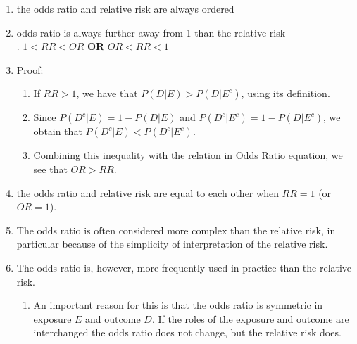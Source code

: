 \begin{enumerate}
    \item the odds ratio and relative risk are always ordered
    \hfill \cite{statistics/book/Statistics-for-Data-Scientists/Maurits-Kaptein}

    \item odds ratio is always further away from 1 than the relative risk
    \hfill \cite{statistics/book/Statistics-for-Data-Scientists/Maurits-Kaptein}
    \\
    .\hfill 
    $1 < RR < OR$ 
    \hfill \textbf{OR} \hfill 
    $OR < RR < 1$
    \hfill \cite{statistics/book/Statistics-for-Data-Scientists/Maurits-Kaptein}

    \item Proof: 
    \begin{enumerate}
        \item  If $RR > 1$, we have that $P(D|E) > P(D|E^c)$, using its definition. 
        \hfill \cite{statistics/book/Statistics-for-Data-Scientists/Maurits-Kaptein}

        \item Since $P(D^c|E) = 1 - P(D|E)$ and $P(D^c|E^c) = 1 - P(D|E^c)$, we obtain that $P(D^c|E) < P(D^c|E^c)$.
        \hfill \cite{statistics/book/Statistics-for-Data-Scientists/Maurits-Kaptein}

        \item Combining this inequality with the relation in Odds Ratio equation, we see that $OR > RR$.
        \hfill \cite{statistics/book/Statistics-for-Data-Scientists/Maurits-Kaptein}

    \end{enumerate}

    \item the odds ratio and relative risk are equal to each other when $RR = 1$ (or $OR = 1$).
    \hfill \cite{statistics/book/Statistics-for-Data-Scientists/Maurits-Kaptein}

    \item The odds ratio is often considered more complex than the relative risk, in particular because of the simplicity of interpretation of the relative risk.
    \hfill \cite{statistics/book/Statistics-for-Data-Scientists/Maurits-Kaptein}

    \item The odds ratio is, however, more frequently used in practice than the relative risk. 
    \hfill \cite{statistics/book/Statistics-for-Data-Scientists/Maurits-Kaptein}
    \begin{enumerate}
        \item An important reason for this is that the odds ratio is symmetric in exposure $E$ and outcome $D$.
        If the roles of the exposure and outcome are interchanged the odds ratio does not change, but the relative risk does.
        \hfill \cite{statistics/book/Statistics-for-Data-Scientists/Maurits-Kaptein}
        
    \end{enumerate}
\end{enumerate}
